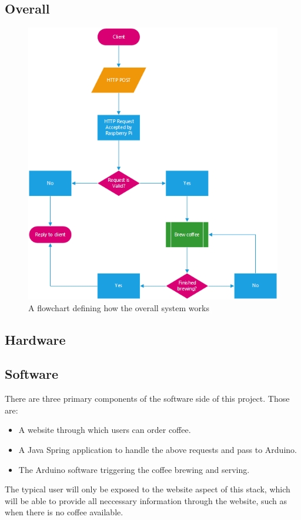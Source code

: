 \documentclass[12pt, a4paper]{article}
\begin{document}
\subsection{Overall}
\begin{figure}[H]
    \centering    
    \includegraphics{images/flowchart}
    \caption{A flowchart defining how the overall system works}
\end{figure}

\newpage

\subsection{Hardware}

\newpage

\subsection{Software}
There are three primary components of the software side of this project. Those
are:
\begin{itemize}
	\item A website through which users can order coffee.
	\item A Java Spring application to handle the above requests and pass to
	Arduino.
	\item The Arduino software triggering the coffee brewing and serving.
\end{itemize}
The typical user will only be exposed to the website aspect of this stack, which
will be able to provide all neccessary information through the website, such as
when there is no coffee available.
\end{document}
